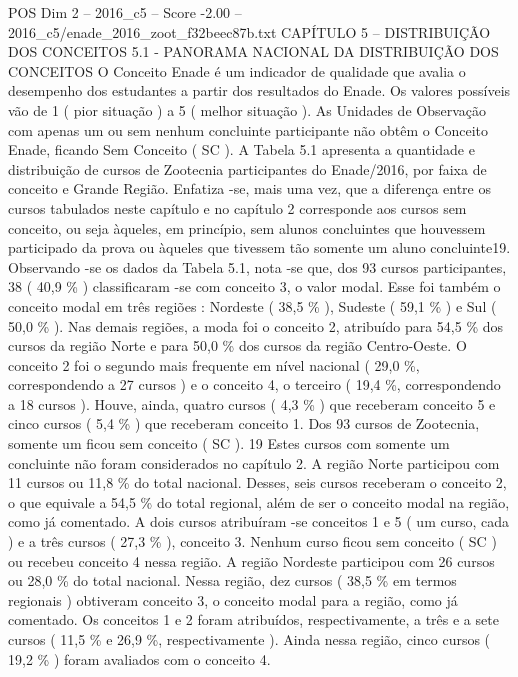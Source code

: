 \begin{textsample}{POS Dim 2 – 2016\_c5 – Score -2.00 – 2016\_c5/enade\_2016\_zoot\_f32beec87b.txt}  \label{ex:f2_pos_404}
CAPÍTULO 5 – DISTRIBUIÇÃO DOS CONCEITOS 5.1 - PANORAMA NACIONAL DA DISTRIBUIÇÃO DOS CONCEITOS O Conceito Enade é um indicador de qualidade que avalia o desempenho dos estudantes a partir dos resultados do Enade.
Os valores possíveis vão de 1 ( pior situação ) a 5 ( melhor situação ).
As Unidades de Observação com apenas um ou sem nenhum concluinte participante não obtêm o Conceito Enade, ficando Sem Conceito ( SC ).
A Tabela 5.1 apresenta a quantidade e distribuição de cursos de Zootecnia participantes do Enade/2016, por faixa de conceito e Grande Região.
Enfatiza -se, mais uma vez, que a diferença entre os cursos tabulados neste capítulo e no capítulo 2 corresponde aos cursos sem conceito, ou seja àqueles, em princípio, sem alunos concluintes que houvessem participado da prova ou àqueles que tivessem tão somente um aluno concluinte19.
Observando -se os dados da Tabela 5.1, nota -se que, dos 93 cursos participantes, 38 ( 40,9 \% ) classificaram -se com conceito 3, o valor modal.
Esse foi também o conceito modal em três regiões : Nordeste ( 38,5 \% ), Sudeste ( 59,1 \% ) e Sul ( 50,0 \% ).
Nas demais regiões, a moda foi o conceito 2, atribuído para 54,5 \% dos cursos da região Norte e para 50,0 \% dos cursos da região Centro-Oeste.
O conceito 2 foi o segundo mais frequente em nível nacional ( 29,0 \%, correspondendo a 27 cursos ) e o conceito 4, o terceiro ( 19,4 \%, correspondendo a 18 cursos ).
Houve, ainda, quatro cursos ( 4,3 \% ) que receberam conceito 5 e cinco cursos ( 5,4 \% ) que receberam conceito 1.
Dos 93 cursos de Zootecnia, somente um ficou sem conceito ( SC ). 19 Estes cursos com somente um concluinte não foram considerados no capítulo 2.
A região Norte participou com 11 cursos ou 11,8 \% do total nacional.
Desses, seis cursos receberam o conceito 2, o que equivale a 54,5 \% do total regional, além de ser o conceito modal na região, como já comentado.
A dois cursos atribuíram -se conceitos 1 e 5 ( um curso, cada ) e a três cursos ( 27,3 \% ), conceito 3.
Nenhum curso ficou sem conceito ( SC ) ou recebeu conceito 4 nessa região.
A região Nordeste participou com 26 cursos ou 28,0 \% do total nacional.
Nessa região, dez cursos ( 38,5 \% em termos regionais ) obtiveram conceito 3, o conceito modal para a região, como já comentado.
Os conceitos 1 e 2 foram atribuídos, respectivamente, a três e a sete cursos ( 11,5 \% e 26,9 \%, respectivamente ).
Ainda nessa região, cinco cursos ( 19,2 \% ) foram avaliados com o conceito 4.

\end{textsample}

